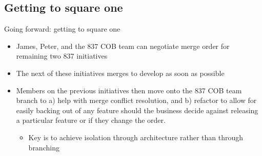 \documentclass{beamer}
\begin{document}
	\subsection{Getting to square one}
	\begin{frame}{Going forward: getting to square one}
		\begin{itemize}
			\item James, Peter, and the 837 COB team can negotiate merge order for remaining two 837 initiatives \pause
			\item The next of these initiatives merges to develop as soon as possible \pause
			\item Members on the previous initiatives then move onto the 837 COB team branch to a) help with merge conflict resolution, and b) refactor to allow for easily backing out of any feature should the business decide against releasing a particular feature or if they change the order. \pause
			\begin{itemize}
				\item Key is to achieve isolation through architecture rather than through branching \pause
			\end{itemize}
		\end{itemize}
	\end{frame}
	\begin{frame}[plain]
		\titlepage
	\end{frame}
\end{document}
